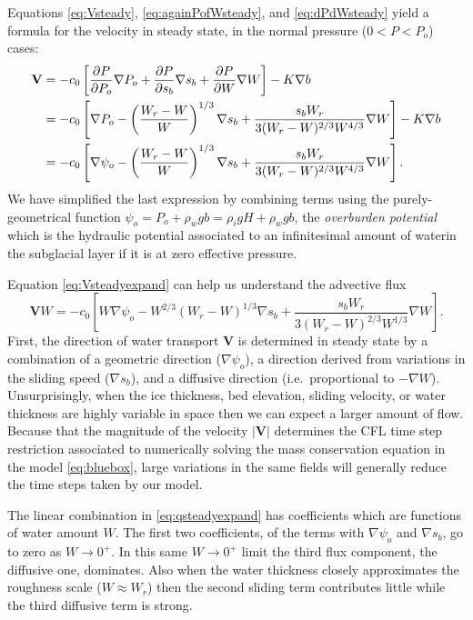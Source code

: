 \documentclass[11pt,final]{amsart}%
\newcommand\bV{\mathbf{V}}
\newcommand{\grad}{\nabla}
\begin{document}
Equations \eqref{eq:Vsteady}, \eqref{eq:againPofWsteady}, and \eqref{eq:dPdWsteady} yield a formula for the velocity in steady state, in the normal pressure ($0 < P < P_o$) cases:
\begin{align}
\bV &= - c_0 \left[\frac{\partial P}{\partial P_o} \grad P_o + \frac{\partial P}{\partial s_b} \grad s_b + \frac{\partial P}{\partial W} \grad W\right] - K \grad b  \notag \\
    &= - c_0 \left[\grad P_o - \left(\frac{W_r - W}{W}\right)^{1/3} \grad s_b + \frac{s_b W_r}{3 (W_r - W)^{2/3} W^{4/3}} \grad W\right] - K \grad b \notag \\
    &= - c_0 \left[\grad \psi_o - \left(\frac{W_r - W}{W}\right)^{1/3} \grad s_b + \frac{s_b W_r}{3 (W_r - W)^{2/3} W^{4/3}} \grad W\right]. \label{eq:Vsteadyexpand}
\end{align}
We have simplified the last expression by combining terms using the purely-geometrical function $\psi_o = P_o + \rho_w g b = \rho_i g H + \rho_w g b$, the \emph{overburden potential} which is the hydraulic potential associated to an infinitesimal amount of waterin the subglacial layer if it is at  zero effective pressure.

Equation \eqref{eq:Vsteadyexpand} can help us understand the advective flux
\begin{equation}
\bV W = - c_0 \left[W \grad \psi_o - W^{2/3} \left(W_r - W\right)^{1/3} \grad s_b + \frac{s_b W_r}{3 (W_r - W)^{2/3} W^{1/3}} \grad W\right].  \label{eq:qsteadyexpand}
\end{equation}
First, the direction of water transport $\bV$ is determined in steady state by a combination of a geometric direction ($\grad \psi_o$), a direction derived from variations in the sliding speed ($\grad s_b$), and a diffusive direction (i.e.~proportional to $-\grad W$).  Unsurprisingly, when the ice thickness, bed elevation, sliding velocity, or water thickness are highly variable in space then we can expect a larger amount of flow.  Because that the magnitude of the velocity $|\bV|$ determines the CFL time step restriction \citep{MortonMayers} associated to numerically solving the mass conservation equation in the model \eqref{eq:bluebox}, large variations in the same fields will generally reduce the time steps taken by our model.

The linear combination in \eqref{eq:qsteadyexpand} has coefficients which are functions of water amount $W$.  The first two coefficients, of the terms with $\grad \psi_o$ and $\grad s_b$, go to zero as $W\to 0^+$.  In this same $W\to 0^+$ limit the third flux component, the diffusive one, dominates.  Also when the water thickness closely approximates the roughness scale ($W\approx W_r$) then the second sliding term contributes little while the third diffusive term is strong.
\end{document}
